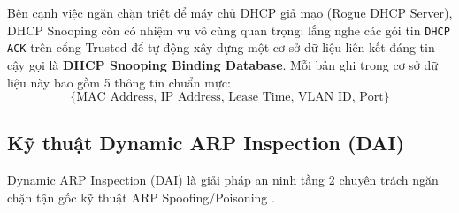 Bên cạnh việc ngăn chặn triệt để máy chủ DHCP giả mạo (Rogue DHCP Server), DHCP Snooping còn có nhiệm vụ vô cùng quan trọng: lắng nghe các gói tin \texttt{DHCP ACK} trên cổng Trusted để tự động xây dựng một cơ sở dữ liệu liên kết đáng tin cậy gọi là \textbf{DHCP Snooping Binding Database}. Mỗi bản ghi trong cơ sở dữ liệu này bao gồm 5 thông tin chuẩn mực:
\begin{equation}
  \{\text{MAC Address, IP Address, Lease Time, VLAN ID, Port}\}
\end{equation}

\subsection{Kỹ thuật Dynamic ARP Inspection (DAI)}

Dynamic ARP Inspection (DAI) là giải pháp an ninh tầng 2 chuyên trách ngăn chặn tận gốc kỹ thuật ARP Spoofing/Poisoning \cite{cisco2022dai}.

